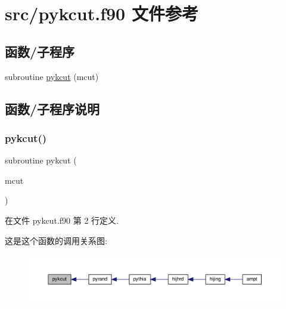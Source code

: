 \hypertarget{pykcut_8f90}{}\section{src/pykcut.f90 文件参考}
\label{pykcut_8f90}
\subsection*{函数/子程序}
\begin{DoxyCompactItemize}
\item 
subroutine \mbox{\hyperlink{pykcut_8f90_a980b3667616fff05d4ab86782f725ad9}{pykcut}} (mcut)
\end{DoxyCompactItemize}


\subsection{函数/子程序说明}
\mbox{\label{pykcut_8f90_a980b3667616fff05d4ab86782f725ad9}} 
\subsubsection{\texorpdfstring{pykcut()}{pykcut()}}
{\footnotesize\ttfamily subroutine pykcut (\begin{DoxyParamCaption}\item[{}]{mcut }\end{DoxyParamCaption})}



在文件 pykcut.\+f90 第 2 行定义.

这是这个函数的调用关系图\+:
\nopagebreak
\begin{figure}[H]
\begin{center}
\leavevmode
\includegraphics[width=350pt]{pykcut_8f90_a980b3667616fff05d4ab86782f725ad9_icgraph}
\end{center}
\end{figure}
